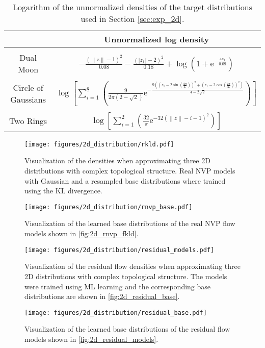 \documentclass[twoside]{article}
\newcommand{\e}{\mathrm{e}}
\newcommand{\norm}[1]{\left\lVert#1\right\rVert}
\begin{document}
\begin{table}[h!]
	\caption{Logarithm of the unnormalized densities of the target distributions used in Section \ref{sec:exp_2d}.}
	\label{tab:equ_toy_examples}
	\centering
	\vspace{0.3cm}
	\begin{tabular}{c|c}
& Unnormalized log density \\
		\hline 
		& \\[-1em]
		Dual Moon & $\displaystyle{-\frac{\left( \norm{z} - 1\right) ^2}{0.08} - \frac{\left( \left| z_1\right| - 2\right) ^2}{0.18} + \log\left( 1 + \e^{-\frac{4z_1}{0.09}}\right) }$ \\[1em]
& \\[-1em]
		Circle of Gaussians &  $\displaystyle{\log\left[ \sum_{i=1}^8 \left( \frac{9}{2\pi\left( 2 - \sqrt{2}\right) } \e^{-\frac{9\left( \left( z_1 - 2\sin\left( \frac{2\pi}{8i}\right) \right) ^ 2 + \left( z_1 - 2\cos\left( \frac{2\pi}{8i}\right) \right) ^ 2 \right) }{4 - 2\sqrt{2}}}\right)\right]  }$ \\[1,5em]
& \\[-1em]
		Two Rings & $\displaystyle{\log\left[ \sum_{i=1}^2 \left( \frac{32}{\pi} \e^{-32\left(\norm{z} - i - 1 \right) ^2 }\right)\right]  }$ \\[1em]
\end{tabular}
\end{table}

\begin{figure}[!h]
    \centering
    \texttt{[image: figures/2d\_distribution/rkld.pdf]}
    \caption{Visualization of the densities when approximating three 2D distributions with complex topological structure. Real NVP models with Gaussian and a resampled base distributions where trained using the KL divergence.}
    \label{fig:2d_rnvp_rkld}


\texttt{[image: figures/2d\_distribution/rnvp\_base.pdf]}
    \caption{Visualization of the learned base distributions of the real NVP flow models shown in \autoref{fig:2d_rnvp_fkld}.}
    \label{fig:2d_residual_base}
\end{figure}

\begin{figure}[!h]
    \centering
    \texttt{[image: figures/2d\_distribution/residual\_models.pdf]}
    \caption{Visualization of the residual flow densities when approximating three 2D distributions with complex topological structure. The models were trained using ML learning and the corresponding base distributions are shown in \autoref{fig:2d_residual_base}.}
    \label{fig:2d_residual_models}


\texttt{[image: figures/2d\_distribution/residual\_base.pdf]}
    \caption{Visualization of the learned base distributions of the residual flow models shown in \autoref{fig:2d_residual_models}.}
    \label{fig:2d_residual_base}
\end{figure}
\end{document}
